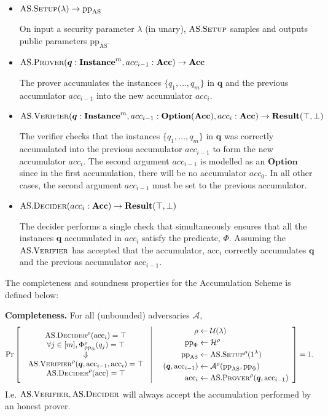 \documentclass[
]{article}
\newcommand*\Ac{\mathcal{A}}
\newcommand*\Uc{\mathcal{U}}
\newcommand*\Hc{\mathcal{H}}
\renewcommand*\l{\lambda}
\renewcommand{\vec}[1]{ \boldsymbol{#1} }
\newcommand*{\pp}{\mathrm{pp}}
\newcommand*{\acc}{\mathrm{acc}}
\newcommand*{\Prover}{\mathrm{\text{P\scriptsize ROVER}}}
\newcommand*{\Verifier}{\mathrm{\text{V\scriptsize ERIFIER}}}
\newcommand*{\Setup}{\mathrm{\text{S{\scriptsize ETUP}}}}
\newcommand*{\Decider}{\mathrm{\text{D{\scriptsize ECIDER}}}}
\newcommand*{\AS}{\text{AS}}
\newcommand*{\ASSetup}{\AS.\Setup}
\newcommand*{\ASProver}{\AS.\Prover}
\newcommand*{\ASVerifier}{\AS.\Verifier}
\newcommand*{\ASDecider}{\AS.\Decider}
\newcommand*\Result{\mathbf{Result}}
\newcommand*\Option{\mathbf{Option}}
\newcommand*\Acc{\mathbf{Acc}}
\newcommand*\Instance{\mathbf{Instance}}
\begin{document}
\begin{itemize}
\item
  \(\ASSetup(\l) \to \pp_\AS\)

  On input a security parameter \(\l\) (in unary), \(\ASSetup\) samples
  and outputs public parameters \(\pp_\AS\).
\item
  \(\ASProver(\vec{q}: \Instance^m, acc_{i-1}: \Acc) \to \Acc\)

  The prover accumulates the instances \(\{ q_1, \dots, q_m \}\) in
  \(\vec{q}\) and the previous accumulator \(acc_{i-1}\) into the new
  accumulator \(acc_i\).
\item
  \(\ASVerifier(\vec{q}: \Instance^m, acc_{i-1}: \Option(\Acc), acc_i: \Acc) \to \Result(\top, \bot)\)

  The verifier checks that the instances \(\{ q_1, \dots, q_m \}\) in
  \(\vec{q}\) was correctly accumulated into the previous accumulator
  \(acc_{i-1}\) to form the new accumulator \(acc_i\). The second
  argument \(acc_{i-1}\) is modelled as an \(\Option\) since in the
  first accumulation, there will be no accumulator \(acc_0\). In all
  other cases, the second argument \(acc_{i-1}\) must be set to the
  previous accumulator.
\item
  \(\ASDecider(acc_i: \Acc) \to \Result(\top, \bot)\)

  The decider performs a single check that simultaneously ensures that
  all the instances \(\vec{q}\) accumulated in \(acc_i\) satisfy the
  predicate, \(\Phi\). Assuming the \(\ASVerifier\) has accepted that
  the accumulator, \(\acc_i\) correctly accumulates \(\vec{q}\) and the
  previous accumulator \(\acc_{i-1}\).
\end{itemize}

The completeness and soundness properties for the Accumulation Scheme is
defined below:

\textbf{Completeness.} For all (unbounded) adversaries \(\Ac\), \[
\Pr \left[
  \begin{array}{c|c}
    \begin{array}{c}
      \ASDecider^\rho(\acc_i) = \top \\
      \forall j \in [m], \Phi^\rho_{\pp_\Phi}(q_j) = \top \\
      \Downarrow \\
      \ASVerifier^\rho(\vec{q}, \acc_{i-1}, \acc_i) = \top \\
      \ASDecider^\rho(\acc) = \top
    \end{array}
    & \quad
    \begin{aligned}
      \rho                  &\leftarrow \Uc(\l) \\
      \pp_\Phi              &\leftarrow \Hc^\rho \\
      \pp_\AS               &\leftarrow \ASSetup^\rho(1^{\l}) \\
      (\vec{q}, \acc_{i-1}) &\leftarrow \Ac^\rho(\pp_\AS, \pp_\Phi) \\
      \acc_i                &\leftarrow \ASProver^{\rho}(\vec{q}, \acc_{i-1})
    \end{aligned}
  \end{array}
\right] = 1.
\] I.e. \(\ASVerifier, \ASDecider\) will always accept the accumulation
performed by an honest prover.
\end{document}
